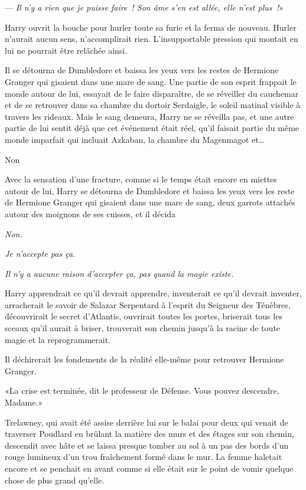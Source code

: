 --- \emph{Il n'y a rien que je puisse faire~! Son âme s'en est allée, elle n'est plus~!}»

Harry ouvrit la bouche pour hurler toute sa furie et la ferma de nouveau. Hurler n'aurait aucun sens, n'accomplirait rien. L'insupportable pression qui montait en lui ne pourrait être relâchée ainsi.

Il se détourna de Dumbledore et baissa les yeux vers les restes de Hermione Granger qui gisaient dans une mare de sang. Une partie de son esprit frappait le monde autour de lui, essayait de le faire disparaître, de se réveiller du cauchemar et de se retrouver dans sa chambre du dortoir Serdaigle, le soleil matinal visible à travers les rideaux. Mais le sang demeura, Harry ne se réveilla pas, et une autre partie de lui sentit déjà que cet événement était réel, qu'il faisait partie du même monde imparfait qui incluait Azkaban, la chambre du Magenmagot et…

Non

Avec la sensation d'une fracture, comme si le temps était encore en miettes autour de lui, Harry se détourna de Dumbledore et baissa les yeux vers les reste de Hermione Granger qui gisaient dans une mare de sang, deux garrots attachés autour des moignons de ses cuisses, et il décida

\emph{Non.}

\emph{Je n'accepte pas ça.}

\emph{Il n'y a aucune raison d'accepter ça, pas quand la magie existe.}

Harry apprendrait ce qu'il devrait apprendre, inventerait ce qu'il devrait inventer, arracherait le savoir de Salazar Serpentard à l'esprit du Seigneur des Ténèbres, découvrirait le secret d'Atlantis, ouvrirait toutes les portes, briserait tous les sceaux qu'il aurait à briser, trouverait son chemin jusqu'à la racine de toute magie et la reprogrammerait.

Il déchirerait les fondements de la réalité elle-même pour retrouver Hermione Granger.

\later

«La crise est terminée, dit le professeur de Défense. Vous pouvez descendre, Madame.»

Trelawney, qui avait été assise derrière lui sur le balai pour deux qui venait de traverser Poudlard en brûlant la matière des murs et des étages sur son chemin, descendit avec hâte et se laissa presque tomber au sol à un pas des bords d'un rouge lumineux d'un trou fraîchement formé dans le mur. La femme haletait encore et se penchait en avant comme si elle était sur le point de vomir quelque chose de plus grand qu'elle.

